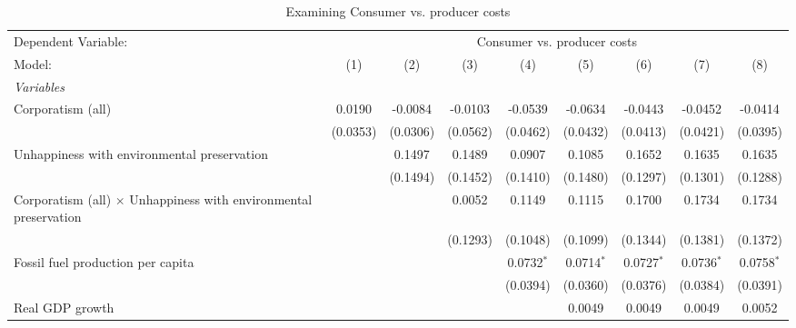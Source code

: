 
\begin{table}[htbp]
   \caption{Examining Consumer vs. producer costs}
   \centering
   \begin{tabular}{lcccccccc}
      \tabularnewline \midrule \midrule
      Dependent Variable: & \multicolumn{8}{c}{Consumer vs. producer costs}\\
      Model:                                                                  & (1)      & (2)      & (3)      & (4)          & (5)          & (6)          & (7)          & (8)\\  
      \midrule
      \emph{Variables}\\
      Corporatism (all)                                                       & 0.0190   & -0.0084  & -0.0103  & -0.0539      & -0.0634      & -0.0443      & -0.0452      & -0.0414\\   
                                                                              & (0.0353) & (0.0306) & (0.0562) & (0.0462)     & (0.0432)     & (0.0413)     & (0.0421)     & (0.0395)\\   
      Unhappiness with environmental preservation                             &          & 0.1497   & 0.1489   & 0.0907       & 0.1085       & 0.1652       & 0.1635       & 0.1635\\   
                                                                              &          & (0.1494) & (0.1452) & (0.1410)     & (0.1480)     & (0.1297)     & (0.1301)     & (0.1288)\\   
      Corporatism (all) $\times$ Unhappiness with environmental preservation  &          &          & 0.0052   & 0.1149       & 0.1115       & 0.1700       & 0.1734       & 0.1734\\   
                                                                              &          &          & (0.1293) & (0.1048)     & (0.1099)     & (0.1344)     & (0.1381)     & (0.1372)\\   
      Fossil fuel production per capita                                       &          &          &          & 0.0732$^{*}$ & 0.0714$^{*}$ & 0.0727$^{*}$ & 0.0736$^{*}$ & 0.0758$^{*}$\\   
                                                                              &          &          &          & (0.0394)     & (0.0360)     & (0.0376)     & (0.0384)     & (0.0391)\\   
      Real GDP growth                                                         &          &          &          &              & 0.0049       & 0.0049       & 0.0049       & 0.0052\\   

\end{tabular}
\end{table}
